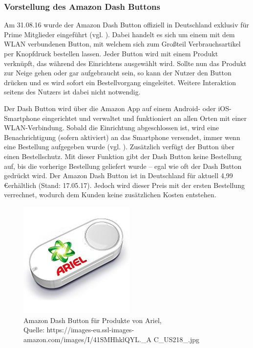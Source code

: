 \subsubsection{Vorstellung des Amazon Dash Buttons}        
\label{sec:Vorstellung des Amazon Dash Buttons} 
Am 31.08.16 wurde der Amazon Dash Button offiziell in Deutschland exklusiv für Prime Mitglieder eingeführt (vgl. \cite{ONLINE.31.08.2016}).
Dabei handelt es sich um einem mit dem WLAN verbundenen Button, mit welchem sich zum Großteil Verbrauchsartikel per Knopfdruck bestellen lassen.
Jeder Button wird mit einem Produkt verknüpft, das während des Einrichtens ausgewählt wird.
Sollte nun das Produkt zur Neige gehen oder gar aufgebraucht sein, so kann der Nutzer den Button drücken und es wird sofort ein Bestellvorgang eingeleitet.
Weitere Interaktion seitens des Nutzers ist dabei nicht notwendig.

Der Dash Button wird über die Amazon App auf einem Android- oder iOS-Smartphone eingerichtet und verwaltet und funktioniert an allen Orten mit einer WLAN-Verbindung.
Sobald die Einrichtung abgeschlossen ist, wird eine Benachrichtigung (sofern aktiviert) an das Smartphone versendet, immer wenn eine Bestellung aufgegeben wurde (vgl. \cite{.dash}).
Zusätzlich verfügt der Button über einen Bestellschutz.
Mit dieser Funktion gibt der Dash Button keine Bestellung auf, bis die vorherige Bestellung geliefert wurde – egal wie oft der Dash Button gedrückt wird.
Der Amazon Dash Button ist in Deutschland für aktuell 4,99  \euro  erhältlich (Stand: 17.05.17).
Jedoch wird dieser Preis mit der ersten Bestellung verrechnet, wodurch dem Kunden keine zusätzlichen Kosten entstehen.

\begin{figure}[!htb]
	\centering
	\includegraphics[scale=0.5]{Dash.jpg}
	\caption[Amazon Dash Button für Produkte von Ariel]{Amazon Dash Button für Produkte von Ariel,\\ Quelle: https://images-eu.ssl-images-amazon.com/images/I/41SMHhklQYL.\_A
	C\_US218\_.jpg}
\end{figure}

